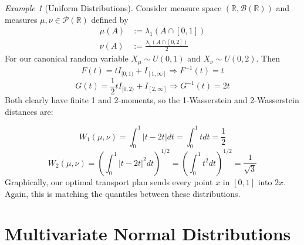 \documentclass[11pt,a4paper]{article}
\theoremstyle{remark}
\newtheorem{example}[theorem]{Example}
\begin{document}
\begin{example}[Uniform Distributions]
Consider measure space $(\mathbb{R}, \mathcal{B}(\mathbb{R}))$ and measures $\mu, \nu \in \mathcal{P}(\mathbb{R})$ defined by \begin{align*}
\mu (A) & := \lambda _1 (A \cap [0,1]) \\ 
\nu (A) & := \frac{\lambda _1 (A \cap [0,2]) }{2}
\end{align*}
For our canonical random variable $X_\mu \sim U(0,1)$ and $X_\nu \sim U(0,2)$. Then \[F(t) = tI_{[0,1)} + I_{[1,\infty]} \Longrightarrow F^{-1}(t) = t\]
\[G(t) = \frac{1}{2}tI_{[0,2)} + I_{[2,\infty]} \Longrightarrow G^{-1}(t) = 2t\]
Both clearly have finite 1 and 2-moments, so the 1-Wasserstein and 2-Wasserstein distances are:

\[
W_1(\mu,\nu) = \int_0^1 |t - 2t| dt = \int_0^1 t dt = \frac{1}{2}
\]
\[
W_2(\mu,\nu) = \left(\int_0^1 |t - 2t|^2 dt\right)^{1/2} = \left(\int_0^1 t^2 dt\right)^{1/2} = \frac{1}{\sqrt{3}}
\]
Graphically, our optimal transport plan sends every point $x$ in $[0,1]$ into $2x$. Again, this is matching the quantiles between these distributions.
~\\
\begin{center}
\end{center}

\end{example}

\section{Multivariate Normal Distributions}
\end{document}
